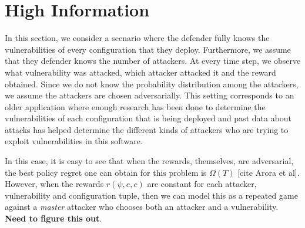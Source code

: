 \section{High Information}\label{sec:high-info}
In this section, we consider a scenario where the defender fully knows the vulnerabilities of every configuration that they deploy. Furthermore, we assume that they defender knows the number of attackers. At every time step, we observe what vulnerability was attacked, which attacker attacked it and the reward obtained. Since we do not know the probability distribution among the attackers, we assume the attackers are chosen adversarially. This setting corresponds to an older application where enough research has been done to determine the vulnerabilities of each configuration that is being deployed and past data about attacks has helped determine the different kinds of attackers who are trying to exploit vulnerabilities in this software.

In this case, it is easy to see that when the rewards, themselves, are adversarial, the best policy regret one can obtain for this problem is $\Omega (T)$ [cite Arora et al]. However, when the rewards $r(\psi, e, c)$ are constant for each attacker, vulnerability and configuration tuple, then we can model this as a repeated game against a {\em master} attacker who chooses both an attacker and a vulnerability. \textbf{Need to figure this out}.

